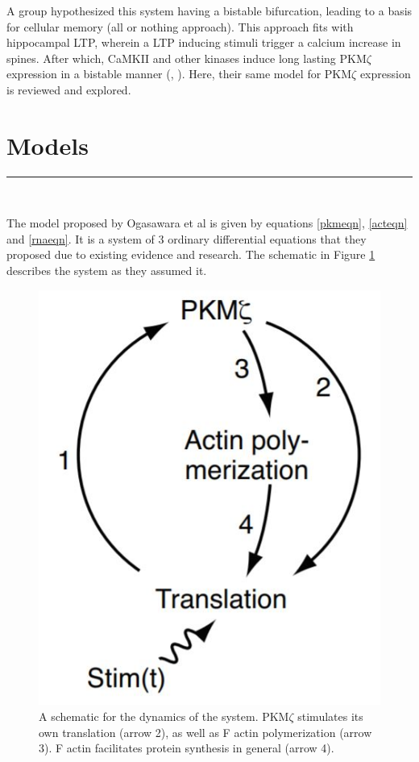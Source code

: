 \documentclass[12pt, a4paper]{article}
\newcommand{\blackbar}{{\nointerlineskip
{\rule{\linewidth}{1mm}}\\}}
\newcommand{\PK}{PKM$\zeta$ }
\newcommand{\citeapa}[1]{(\citeauthor{#1}, \citeyear{#1})}
\begin{document}
A group hypothesized this system having a bistable bifurcation, leading to a basis for cellular memory (all or nothing approach). This approach fits with hippocampal LTP, wherein a LTP inducing stimuli trigger a calcium increase in spines. After which, CaMKII and other kinases induce long lasting \PK expression in a bistable manner \citeapa{pkmZeta}. Here, their same model for \PK expression is reviewed and explored. 



\section*{Models}
\blackbar
The model proposed by Ogasawara et al is given by equations \ref{pkmeqn}, \ref{acteqn} and \ref{rnaeqn}. It is a system of 3 ordinary differential equations that they proposed due to existing evidence and research. The schematic in Figure \ref{pathway} describes the system as they assumed it. 
\begin{figure}[H]
    \centering
    \includegraphics{pics/pathway.JPG}
    \caption{A schematic for the dynamics of the system. \PK stimulates its own translation (arrow 2), as well as F actin polymerization (arrow 3). F actin facilitates protein synthesis in general (arrow 4).}
    \label{pathway}
\end{figure}
\end{document}
